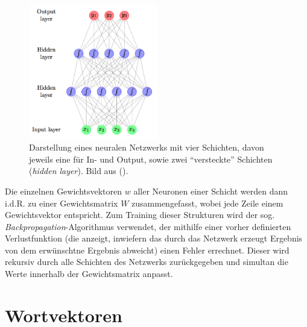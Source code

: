 \begin{figure}[h]
  \centering
  \includegraphics[width=0.5\textwidth]{../img/neuralnet.png}
  \caption[Darstellung eine neuralen Netzwerks]{Darstellung eines neuralen Netzwerks mit vier Schichten, davon jeweils eine
  für In- und Output, sowie zwei ``versteckte'' Schichten (\emph{hidden layer}). Bild aus (\cite{Goldberg15c}).\label{fig:neuralnet}}
\end{figure}

Die einzelnen Gewichtsvektoren $w$ aller Neuronen einer Schicht werden dann i.d.R. zu einer Gewichtsmatrix $W$ zusammengefasst,
wobei jede Zeile einem Gewichtsvektor entspricht. Zum Training dieser Strukturen wird der sog. \emph{Backpropagation}-Algorithmus verwendet, der mithilfe einer vorher definierten Verlustfunktion (die anzeigt, inwiefern das durch das Netzwerk
erzeugt Ergebnis von dem erwünschtne Ergebnis abweicht) einen Fehler errechnet. Dieser wird rekursiv durch alle
Schichten des Netzwerks zurückgegeben und simultan die Werte innerhalb der Gewichtsmatrix anpasst.

\section{Wortvektoren}\label{sec:wordvec}

